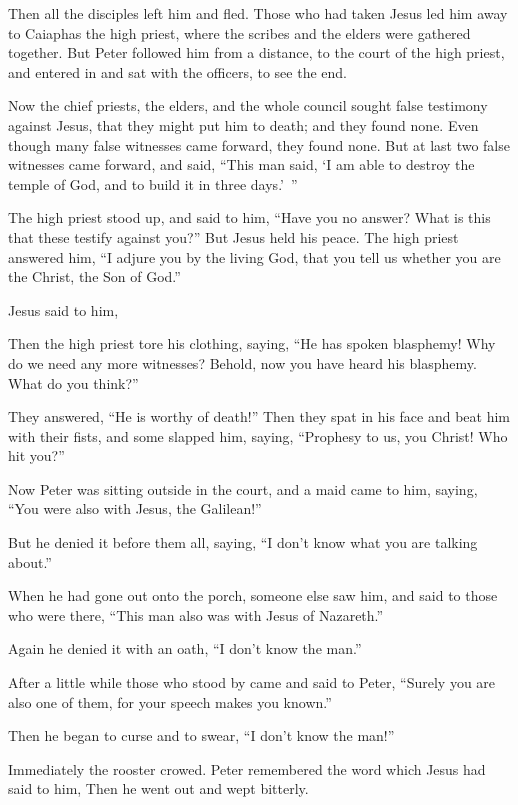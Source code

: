 {{{}}
\par }{\PP Then all the disciples left him and fled.
Those who had taken Jesus led him away to Caiaphas the high priest, where the scribes and the elders were gathered together.
But Peter followed him from a distance, to the court of the high priest, and entered in and sat with the officers, to see the end.
\par }{\PP {}Now the chief priests, the elders, and the whole council sought false testimony against Jesus, that they might put him to death;
and they found none. Even though many false witnesses came forward, they found none. But at last two false witnesses came forward,
and said, “This man said, ‘I am able to destroy the temple of God, and to build it in three days.’ ”
\par }{\PP {}The high priest stood up, and said to him, “Have you no answer? What is this that these testify against you?”
But Jesus held his peace. The high priest answered him, “I adjure you by the living God, that you tell us whether you are the Christ, the Son of God.”
\par }{\PP {}Jesus said to him,
{}
\par }{\PP {}Then the high priest tore his clothing, saying, “He has spoken blasphemy! Why do we need any more witnesses? Behold, now you have heard his blasphemy.
What do you think?”
\par }{\PP They answered, “He is worthy of death!”
Then they spat in his face and beat him with their fists, and some slapped him,
saying, “Prophesy to us, you Christ! Who hit you?”
\par }{\PP {}Now Peter was sitting outside in the court, and a maid came to him, saying, “You were also with Jesus, the Galilean!”
\par }{\PP {}But he denied it before them all, saying, “I don’t know what you are talking about.”
\par }{\PP {}When he had gone out onto the porch, someone else saw him, and said to those who were there, “This man also was with Jesus of Nazareth.”
\par }{\PP {}Again he denied it with an oath, “I don’t know the man.”
\par }{\PP {}After a little while those who stood by came and said to Peter, “Surely you are also one of them, for your speech makes you known.”
\par }{\PP {}Then he began to curse and to swear, “I don’t know the man!”
\par }{\PP Immediately the rooster crowed.
Peter remembered the word which Jesus had said to him,
{} Then he went out and wept bitterly.

}

